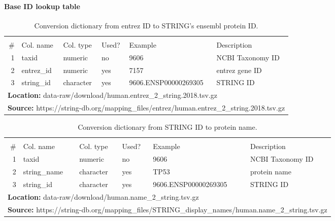 \hypertarget{base-id-lookup-table}{%
\paragraph{Base ID lookup table}\label{base-id-lookup-table}}

\begin{table}[H]

\caption{\label{tab:link_entrez_string}Conversion dictionary from entrez ID to STRING's ensembl protein ID.}
\centering
\begin{tabular}[t]{rlllll}
\toprule
\multicolumn{6}{c}{\bgroup\fontsize{12}{14}\selectfont \cellcolor[HTML]{EEEEEE}{\ttfamily{\textbf{link\_entrez\_string}}}\egroup{}} \\
\cmidrule(l{3pt}r{3pt}){1-6}
\# & Col. name & Col. type & Used? & Example & Description\\
\midrule
\rowcolor{gray!6}  1 & taxid & numeric & no & 9606 & NCBI Taxonomy ID\\
2 & entrez\_id & numeric & yes & 7157 & entrez gene ID\\
\rowcolor{gray!6}  3 & string\_id & character & yes & 9606.ENSP00000269305 & STRING ID\\
\bottomrule
\multicolumn{6}{l}{\textbf{Location: } data-raw/download/human.entrez\_2\_string.2018.tsv.gz}\\
\multicolumn{6}{l}{\textbf{Source: } https://string-db.org/mapping\_files/entrez/human.entrez\_2\_string.2018.tsv.gz}\\
\end{tabular}
\end{table}
\begin{table}[H]

\caption{\label{tab:string_names}Conversion dictionary from STRING ID to protein name.}
\centering
\begin{tabular}[t]{rlllll}
\toprule
\multicolumn{6}{c}{\bgroup\fontsize{12}{14}\selectfont \cellcolor[HTML]{EEEEEE}{\ttfamily{\textbf{string\_names}}}\egroup{}} \\
\cmidrule(l{3pt}r{3pt}){1-6}
\# & Col. name & Col. type & Used? & Example & Description\\
\midrule
\rowcolor{gray!6}  1 & taxid & numeric & no & 9606 & NCBI Taxonomy ID\\
2 & string\_name & character & yes & TP53 & protein name\\
\rowcolor{gray!6}  3 & string\_id & character & yes & 9606.ENSP00000269305 & STRING ID\\
\bottomrule
\multicolumn{6}{l}{\textbf{Location: } data-raw/download/human.name\_2\_string.tsv.gz}\\
\multicolumn{6}{l}{\textbf{Source: } https://string-db.org/mapping\_files/STRING\_display\_names/human.name\_2\_string.tsv.gz}\\
\end{tabular}
\end{table}
